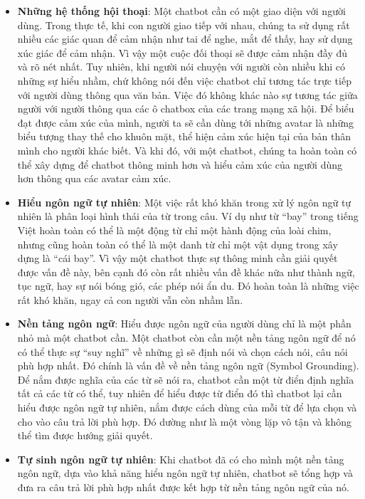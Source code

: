 \documentclass[12pt]{report}
\begin{document}
\begin{itemize}
	\item \textbf{Những hệ thống hội thoại}:
	Một chatbot cần có một giao diện với người dùng. Trong thực tế, khi con người giao tiếp với nhau, chúng ta sử dụng rất nhiều các giác quan để cảm nhận như tai để nghe, mắt để thấy, hay sử dụng xúc giác để cảm nhận. Vì vậy một cuộc đối thoại sẽ được cảm nhận đầy đủ và rõ nét nhất. Tuy nhiên, khi người nói chuyện với người còn nhiều khi có những sự hiểu nhầm, chứ không nói đến việc chatbot chỉ tương tác trực tiếp với người dùng thông qua văn bản. Việc đó không khác nào sự tương tác giữa người với người thông qua các ô chatbox của các trang mạng xã hội. Để biểu đạt được cảm xúc của mình, người ta sẽ cần dùng tới những avatar là những biểu tượng thay thế cho khuôn mặt, thể hiện cảm xúc hiện tại của bản thân mình cho người khác biết. Và khi đó, với một chatbot, chúng ta hoàn toàn có thể xây dựng để chatbot thông minh hơn và hiểu cảm xúc của người dùng hơn thông qua các avatar cảm xúc.
	\item \textbf{Hiểu ngôn ngữ tự nhiên}:
	Một việc rất khó khăn trong xử lý ngôn ngữ tự nhiên là phân loại hình thái của từ trong câu. Ví dụ như từ ``bay'' trong tiếng Việt hoàn toàn có thể là một động từ chỉ một hành động của loài chim, nhưng cũng hoàn toàn có thể là một danh từ chỉ một vật dụng trong xây dựng là ``cái bay''. Vì vậy một chatbot thực sự thông minh cần giải quyết được vấn đề này, bên cạnh đó còn rất nhiều vấn đề khác nữa như thành ngữ, tục ngữ, hay sự nói bóng gió, các phép nói ẩn du. Đó hoàn toàn là những việc rất khó khăn, ngay cả con người vẫn còn nhầm lẫn.
	\item \textbf{Nền tảng ngôn ngữ}:
	Hiểu được ngôn ngữ của người dùng chỉ là một phần nhỏ mà một chatbot cần. Một chatbot còn cần một nền tảng ngôn ngữ để nó có thể thực sự ``suy nghĩ'' về những gì sẽ định nói và chọn cách nói, câu nói phù hợp nhất. Đó chính là vấn đề về nền tảng ngôn ngữ (Symbol Grounding). Để nắm được nghĩa của các từ sẽ nói ra, chatbot cần một từ điển định nghĩa tất cả các từ có thể, tuy nhiên để hiểu được từ điển đó thì chatbot lại cần hiểu được ngôn ngữ tự nhiên, nắm được cách dùng của mỗi từ để lựa chọn và cho vào câu trả lời phù hợp. Đó dường như là một vòng lặp vô tận và không thể tìm được hướng giải quyết.
	\item \textbf{Tự sinh ngôn ngữ tự nhiên}:
	Khi chatbot đã có cho mình một nền tảng ngôn ngữ, dựa vào khả năng hiểu ngôn ngữ tự nhiên, chatbot sẽ tổng hợp và đưa ra câu trả lời phù hợp nhất được kết hợp từ nền tảng ngôn ngữ của nó.
\end{itemize}
\end{document}
